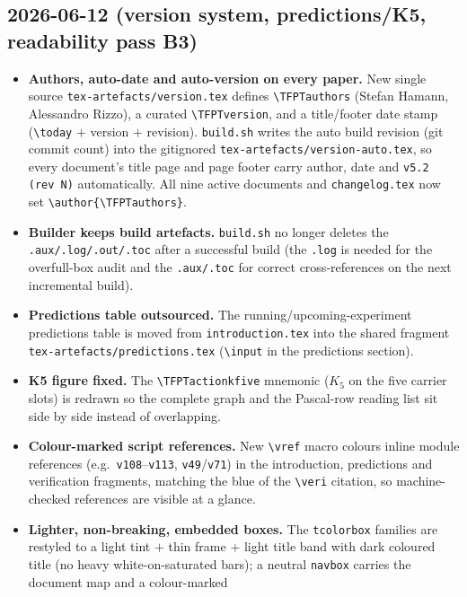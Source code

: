 \documentclass[11pt]{article}
\providecommand{\vref}[1]{\texttt{#1}}
\providecommand{\TFPTversion}{5.2}\providecommand{\TFPTrev}{dev}
\begin{document}
\subsection*{2026-06-12 (version system, predictions/K5, readability pass B3)}
\begin{itemize}
\item \textbf{Authors, auto-date and auto-version on every paper.} New single source
  \texttt{tex-artefacts/version.tex} defines \texttt{\textbackslash TFPTauthors} (Stefan Hamann,
  Alessandro Rizzo), a curated \texttt{\textbackslash TFPTversion}, and a title/footer date stamp
  (\texttt{\textbackslash today} $+$ version $+$ revision). \texttt{build.sh} writes the auto build
  revision (git commit count) into the gitignored \texttt{tex-artefacts/version-auto.tex}, so every
  document's title page and page footer carry author, date and \texttt{v\TFPTversion\,(rev~N)}
  automatically. All nine active documents and \texttt{changelog.tex} now set
  \texttt{\textbackslash author\{\textbackslash TFPTauthors\}}.
\item \textbf{Builder keeps build artefacts.} \texttt{build.sh} no longer deletes the
  \texttt{.aux/.log/.out/.toc} after a successful build (the \texttt{.log} is needed for the
  overfull-box audit and the \texttt{.aux/.toc} for correct cross-references on the next incremental
  build).
\item \textbf{Predictions table outsourced.} The running/upcoming-experiment predictions table is moved
  from \texttt{introduction.tex} into the shared fragment \texttt{tex-artefacts/predictions.tex}
  (\texttt{\textbackslash input} in the predictions section).
\item \textbf{K5 figure fixed.} The \texttt{\textbackslash TFPTactionkfive} mnemonic ($K_5$ on the five
  carrier slots) is redrawn so the complete graph and the Pascal-row reading list sit side by side
  instead of overlapping.
\item \textbf{Colour-marked script references.} New \texttt{\textbackslash vref} macro colours inline
  module references (e.g.\ \vref{v108}--\vref{v113}, \vref{v49}/\vref{v71}) in the introduction,
  predictions and verification fragments, matching the blue of the \texttt{\textbackslash veri}
  citation, so machine-checked references are visible at a glance.
\item \textbf{Lighter, non-breaking, embedded boxes.} The \texttt{tcolorbox} families are restyled to a
  light tint $+$ thin frame $+$ light title band with dark coloured title (no heavy
  white-on-saturated bars); a neutral \texttt{navbox} carries the document map and a colour-marked

\end{itemize}
\end{document}
